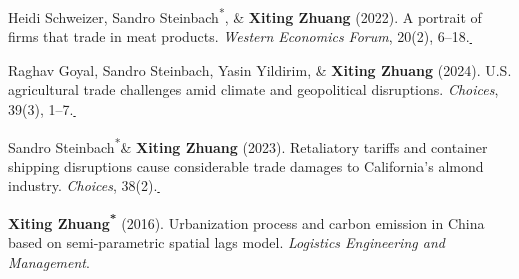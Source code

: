 \documentclass[10.8 pt,letterpaper]{article}
\newcommand{\corrauthor}{\textsuperscript{*}}
\newcommand{\paperlink}[1]{\href{#1}{\,\small\faExternalLink}}
\renewenvironment{itemize}{
	\begin{list}{}{
			\setlength{\leftmargin}{1.5em}
		}
	}{
	\end{list}
}
\begin{document}
\begin{itemize}
		\item[-] Heidi Schweizer, Sandro Steinbach\corrauthor, \& \textbf{Xiting Zhuang} (2022). A portrait of firms that trade in meat products. \textit{Western Economics Forum}, 20(2), 6--18.\paperlink{https://doi.org/10.22004/ag.econ.329728}
		
		\item[-] Raghav Goyal, Sandro Steinbach, Yasin Yildirim, \& \textbf{Xiting Zhuang} (2024). U.S. agricultural trade challenges amid climate and geopolitical disruptions. \textit{Choices}, 39(3), 1--7.\paperlink{https://www.choicesmagazine.org/choices-magazine/submitted-articles/us-agricultural-trade-challenges-amid-climate-and-geopolitical-disruptions}
		
		\item[-] Sandro Steinbach\corrauthor \& \textbf{Xiting Zhuang} (2023). Retaliatory tariffs and container shipping disruptions cause considerable trade damages to California's almond industry. \textit{Choices}, 38(2).\paperlink{https://www.choicesmagazine.org/choices-magazine/submitted-articles/retaliatory-tariffs-and-container-shipping-disruptions-cause-considerable-trade-damages-to-californias-almond-industry}
		
		\item[-] \textbf{Xiting Zhuang\corrauthor} (2016). Urbanization process and carbon emission in China based on semi-parametric spatial lags model. \textit{Logistics Engineering and Management}.
	\end{itemize}
	
	
\end{document}
